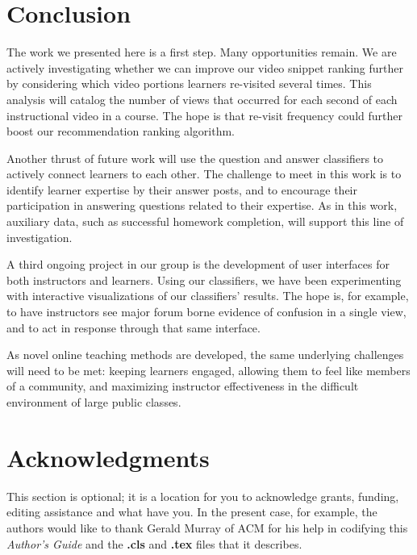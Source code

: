 \documentclass{edm_template}
\begin{document}
\section{Conclusion}
\label{sec:conclusion}
The work we presented here is a first step. Many opportunities
remain. We are actively investigating whether we can improve our video
snippet ranking further by considering which video portions learners
re-visited several times. This analysis will catalog the number of
views that occurred for each second of each instructional video in a
course. The hope is that re-visit frequency could further boost our
recommendation ranking algorithm. 

Another thrust of future work will use the question and answer
classifiers to actively connect learners to each other. The challenge
to meet in this work is to identify learner expertise by their answer
posts, and to encourage their participation in answering questions
related to their expertise. As in this work, auxiliary data, such as
successful homework completion, will support this line of
investigation.

A third ongoing project in our group is the development of user
interfaces for both instructors and learners. Using our classifiers,
we have been experimenting with interactive visualizations of our
classifiers' results. The hope is, for example, to have instructors
see major forum borne evidence of confusion in a single view, and to
act in response through that same interface.

As novel online teaching methods are developed, the same underlying
challenges will need to be met: keeping learners engaged, allowing
them to feel like members of a community, and maximizing instructor
effectiveness in the difficult environment of large public classes.


\section{Acknowledgments}
This section is optional\cite{wen2014sentiment}; it is a location for you
to acknowledge grants, funding, editing assistance and
what have you.  In the present case, for example, the
authors would like to thank Gerald Murray of ACM for
his help in codifying this \textit{Author's Guide}
and the \textbf{.cls} and \textbf{.tex} files that it describes.

%

%
%
\balancecolumns
\end{document}
